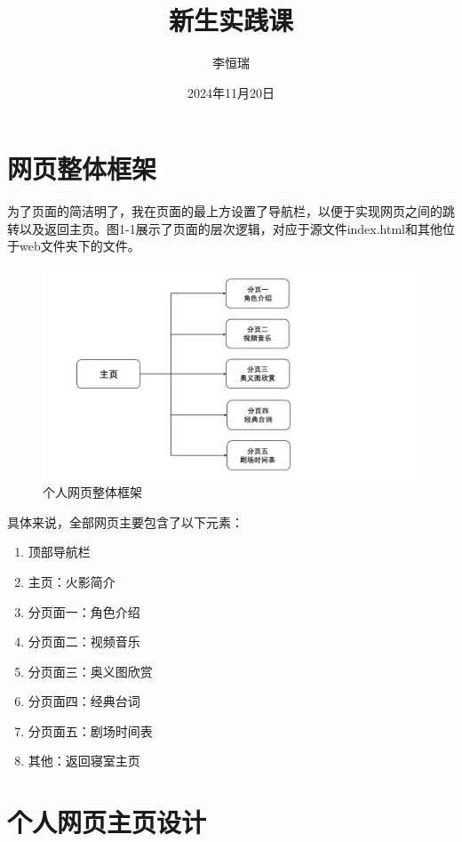 \documentclass[supercite]{Experimental_Report}
\title{新生实践课}
\author{李恒瑞}
\date{2024年11月20日}
\theoremstyle{definition}
\begin{document}
\maketitle

\clearpage


\tableofcontents[level=2]

\clearpage


\section{网页整体框架}
为了页面的简洁明了，我在页面的最上方设置了导航栏，以便于实现网页之间的跳转以及返回主页。图1-1展示了页面的层次逻辑，对应于源文件index.html和其他位于web文件夹下的文件。
\begin{figure}[h]
	\centering
	\includegraphics[scale=0.2]{images/1-1.jpg}
	\caption{个人网页整体框架}
	\label{fig1-1}
\end{figure}
具体来说，全部网页主要包含了以下元素：
\begin{enumerate}
	\item 顶部导航栏
	\item 主页：火影简介
	\item 分页面一：角色介绍
	\item 分页面二：视频音乐
	\item 分页面三：奥义图欣赏
	\item 分页面四：经典台词
	\item 分页面五：剧场时间表
	\item 其他：返回寝室主页
\end{enumerate}

\section{个人网页主页设计}
\end{document}
